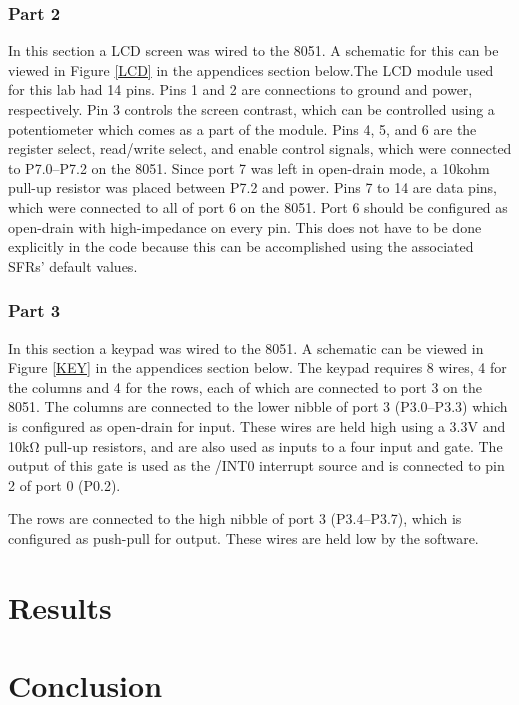 \documentclass[12pt]{article}
\begin{document}
\subsubsection{Part 2}
In this section a LCD screen was wired to the 8051. A schematic for this can be viewed in Figure \ref{LCD} in the appendices section below.The LCD module used for this lab had 14 pins.
Pins 1 and 2 are connections to ground and power, respectively. Pin 3 controls the screen contrast, which can be controlled using a potentiometer which comes as a part of the module. Pins 4, 5, and 6 are the register select, read/write select, and enable control signals, which were connected to P7.0--P7.2 on the 8051. Since port 7 was left in open-drain mode, a 10k\si{ohm} pull-up resistor was placed between P7.2 and power. Pins 7 to 14 are data pins, which were connected to all of port 6 on the 8051. Port 6 should be configured as open-drain with high-impedance on every pin. This does not have to be done explicitly in the code because this can be accomplished using the associated SFRs' default values.

\subsubsection{Part 3}
In this section a keypad was wired to the 8051. A schematic can be viewed in Figure \ref{KEY} in the appendices section below. The keypad requires 8 wires, 4 for the columns and 4 for the rows, each of which are connected to port 3 on the 8051. The columns are connected to the lower nibble of port 3 (P3.0--P3.3) which is configured as open-drain for input. These wires are held high using a 3.3\si{V} and 10k\si{\ohm} pull-up resistors, and are also used as inputs to a four input and gate. The output of this gate is used as the /INT0 interrupt source and is connected to pin 2 of port 0 (P0.2).

The rows are connected to the high nibble of port 3 (P3.4--P3.7), which is configured as push-pull for output. These wires are held low by the software. 

\section{Results}



\section{Conclusion}
 
\end{document}
